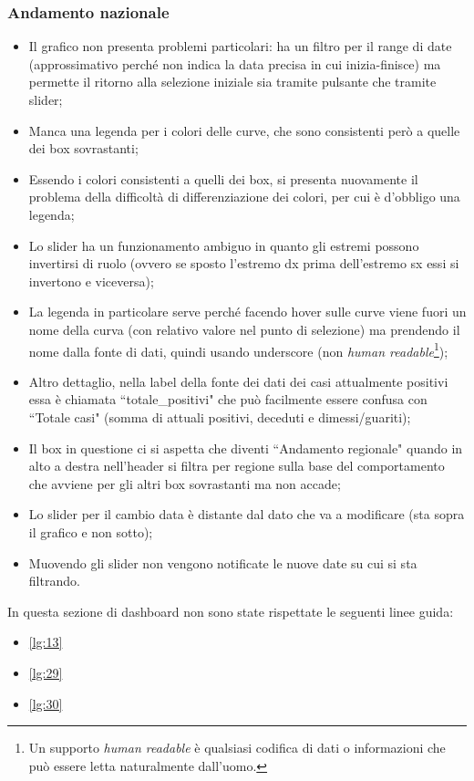 \subsubsection{Andamento nazionale}
\label{sss:andamento-nazionale}
\begin{itemize}
    \item Il grafico non presenta problemi particolari: ha un filtro per il range di date (approssimativo perché non indica la data precisa in cui inizia-finisce) ma permette il ritorno alla selezione iniziale sia tramite pulsante che tramite slider;
    \item Manca una legenda per i colori delle curve, che sono consistenti però a quelle dei box sovrastanti;
    \item Essendo i colori consistenti a quelli dei box, si presenta nuovamente il problema della difficoltà di differenziazione dei colori, per cui è d'obbligo una legenda;
    \item Lo slider ha un funzionamento ambiguo in quanto gli estremi possono invertirsi di ruolo (ovvero se sposto l'estremo dx prima dell'estremo sx essi si invertono e viceversa);
    \item La legenda in particolare serve perché facendo hover sulle curve viene fuori un nome della curva (con relativo valore nel punto di selezione) ma prendendo il nome dalla fonte di dati, quindi usando underscore (non \textit{human readable}\footnote{Un supporto \textit{human readable} è qualsiasi codifica di dati o informazioni che può essere letta naturalmente dall'uomo.});
    \item Altro dettaglio, nella label della fonte dei dati dei casi attualmente positivi essa è chiamata ``totale\_positivi" che può facilmente essere confusa con ``Totale casi" (somma di attuali positivi, deceduti e dimessi/guariti);
    \item Il box in questione ci si aspetta che diventi ``Andamento regionale" quando in alto a destra nell'header si filtra per regione sulla base del comportamento che avviene per gli altri box sovrastanti ma non accade;
    \item Lo slider per il cambio data è distante dal dato che va a modificare (sta sopra il grafico e non sotto);
    \item Muovendo gli slider non vengono notificate le nuove date su cui si sta filtrando.
\end{itemize}
In questa sezione di dashboard non sono state rispettate le seguenti linee guida:
\begin{itemize}
    \item \ref{lg:13}
    \item \ref{lg:29}
    \item \ref{lg:30}
\end{itemize}

